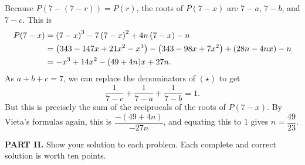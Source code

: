 \documentclass[11pt,paper=letter]{scrartcl}
\begin{document}
\begin{enumerate}[left=0pt]
Because $P(7-(7-r)) = P(r)$, the roots of $P(7-x)$ are $7-a$, $7-b$, and $7-c$. This is
\begin{align*}P(7-x) &= \left( 7 - x \right)^3 - 7\left( 7 - x \right)^2 + 4n\left( 7 - x \right) - n \\
&= \left( 343 - 147x + 21x^2 - x^3 \right) - \left( 343 - 98x + 7x^2 \right) + \left( 28n - 4nx \right) - n \\
&= -x^3 + 14x^2 - (49 + 4n)x + 27n.\end{align*}As $a + b +c = 7$, we can replace the denominators of $(\star)$ to get $$\frac1{7-c} + \frac1{7-a} + \frac1{7-b} = 1.$$ But this is precisely the sum of the reciprocals of the roots of $P(7-x)$. By Vieta's formulas again, this is $\dfrac{-(49+4n)}{-27n}$, and equating this to $1$ gives $n = \dfrac{49}{23}$.

\end{enumerate}

\noindent\textbf{PART II.} Show your solution to each problem. Each complete and correct solution is worth ten points.
\end{document}
